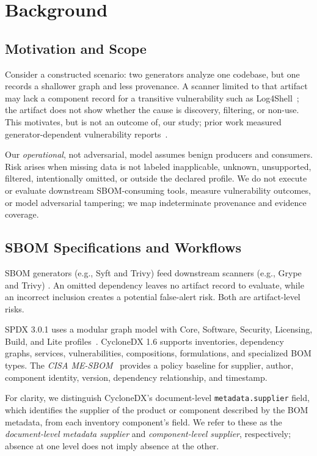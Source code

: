 \section{Background}

\label{sec:background}

\subsection{Motivation and Scope}
Consider a constructed scenario: two generators analyze one codebase, but one records a shallower graph and less provenance. A scanner limited to that artifact may lack a component record for a transitive vulnerability such as Log4Shell~\cite{CVE202144228}; the artifact does not show whether the cause is discovery, filtering, or non-use. This motivates, but is not an outcome of, our study; prior work measured generator-dependent vulnerability reports~\cite{odonoghuescored2024,benedettipython2024}.

Our \emph{operational}, not adversarial, model assumes benign producers and consumers. Risk arises when missing data is not labeled inapplicable, unknown, unsupported, filtered, intentionally omitted, or outside the declared profile. We do not execute or evaluate downstream SBOM-consuming tools, measure vulnerability outcomes, or model adversarial tampering; we map indeterminate provenance and evidence coverage.

\subsection{SBOM Specifications and Workflows}
SBOM generators (e.g., Syft and Trivy) feed downstream scanners (e.g., Grype and Trivy) \cite{syftgithub,trivygithub,grypegithub}. An omitted dependency leaves no artifact record to evaluate, while an incorrect inclusion creates a potential false-alert risk. Both are artifact-level risks.

SPDX 3.0.1 uses a modular graph model with Core, Software, Security, Licensing, Build, and Lite profiles~\cite{spdx301}. CycloneDX 1.6 supports inventories, dependency graphs, services, vulnerabilities, compositions, formulations, and specialized BOM types. The \textit{CISA ME-SBOM}~\cite{cisaframing2024} provides a policy baseline for supplier, author, component identity, version, dependency relationship, and timestamp.

For clarity, we distinguish CycloneDX's document-level \texttt{metadata.supplier} field, which identifies the supplier of the product or component described by the BOM metadata, from each inventory component's  field. We refer to these as the \emph{document-level metadata supplier} and \emph{component-level supplier}, respectively; absence at one level does not imply absence at the other.

